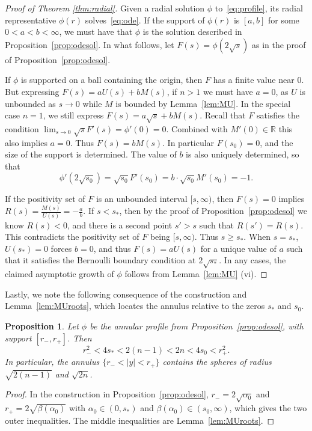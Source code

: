 \documentclass[11pt]{article}
\numberwithin{equation}{section}
\newtheorem{proposition}[theorem]{Proposition}
\theoremstyle{definition}
\newcommand{\RR}{\mathbb{R}}
\begin{document}
\begin{proof}[Proof of Theorem \ref{thm:radial}]
    Given a radial solution $\phi $ to~\eqref{eq:profile}, 
its radial representative $\phi (r)$ solves~\eqref{eq:ode}.
If the support of $\phi (r)$ is $\left[ a, b \right]$
for some $0 < a < b < \infty$, 
we must have that $\phi $ is the solution described in Proposition~\ref{prop:odesol}. 
In what follows, let $F(s) = \phi \left( 2\sqrt s \right)$
as in the proof of Proposition~\ref{prop:odesol}. 

If $\phi $ is supported on a ball containing the origin, 
then $F$ has a finite value near $0$. 
But expressing $F(s) = aU(s) + b M(s)$, if $n>1$ we must have $a = 0$, 
as $U$ is unbounded as $s\to 0$ while $M$ is bounded by Lemma~\ref{lem:MU}. In the special case $n=1$, we still express $F(s)=a\sqrt{s}+bM(s)$. Recall that $F$ satisfies the condition $\lim_{s\to0} \sqrt{s}F'(s) = \phi'(0)= 0$. Combined with $M'(0) \in \RR$ this also implies $a=0$.  
Thus $F(s) = bM(s)$. In particular $F \left( s_0 \right) = 0$, 
and the size of the support is determined. The value of $b$ is also uniquely determined, so that
\[ \phi'\left( 2\sqrt{s_0} \right) = \sqrt{s_0} F'(s_0) = b\cdot \sqrt{s_0} M'(s_0) = -1. \]  


If the positivity set of $F $ is an unbounded interval $[s,\infty)$, 
then $F(s) = 0$ implies $R(s)= \frac{M(s)}{U(s)} = -\frac{a}{b}$. 
If $s < s_*$, then by the proof of Proposition~\ref{prop:odesol} 
we know $R(s) < 0$, 
and there is a second point $s' > s$ such that $R\left( s' \right) = R(s)$.
This contradicts the positivity set of $F$ being $[s,\infty)$. 
Thus $s \geq s_*$. 
When $s = s_*$, $U\left( s_* \right) = 0$ forces $b = 0$, and thus $F(s) = aU(s)$ for a unique value of $a$ such that it satisfies the Bernoulli boundary condition at $2\sqrt{s_*}$.
In any cases, the claimed asymptotic growth of $\phi $ 
follows from Lemma~\ref{lem:MU} (vi). 

\end{proof}

Lastly, we note the following consequence of the construction and Lemma~\ref{lem:MUroots}, which locates the annulus relative to the zeros $s_*$ and $s_0$.
\begin{proposition}\label{prop:annulus-containment}
Let $\phi$ be the annular profile from Proposition~\ref{prop:odesol}, with support $[r_-,r_+]$. Then
\begin{equation}\label{eq:annulus-containment}
    r_-^2 < 4s_* < 2(n-1) < 2n < 4s_0 < r_+^2.
\end{equation}
In particular, the annulus $\{r_-<|y|<r_+\}$ contains the spheres of radius $\sqrt{2(n-1)}$ and $\sqrt{2n}$.
\end{proposition}
\begin{proof}
In the construction in Proposition~\ref{prop:odesol}, $r_-=2\sqrt{\alpha_0}$ and $r_+=2\sqrt{\beta(\alpha_0)}$ with $\alpha_0\in(0,s_*)$ and $\beta(\alpha_0)\in(s_0,\infty)$, which gives the two outer inequalities. The middle inequalities are Lemma~\ref{lem:MUroots}.
\end{proof}
\end{document}

